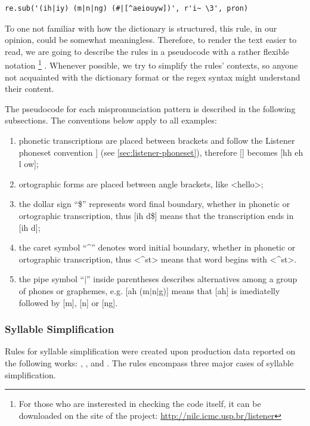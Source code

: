 \begin{lstlisting}[float=!h,caption=Example of a fully-specified regex rule.]
re.sub('(ih|iy) (m|n|ng) (#|[^aeiouyw])', r'i~ \3', pron)
\end{lstlisting}

To one not familiar with how the dictionary is structured, this rule, in our opinion, could be somewhat meaningless. Therefore,  to 
render the text easier to read, we are going to describe the rules in a pseudocode with a rather flexible notation
\footnote{For those who are insterested in checking the code itself, it can be downloaded on the site of the project:
\url{http://nilc.icmc.usp.br/listener}}
.
Whenever possible, we try to simplify the rules' contexts, so anyone not acquainted with the dictionary format or the
\ac{regex} syntax might understand their content.

The pseudocode for each mispronunciation pattern is described in the following subsections. The conventions below apply to all examples:

\begin{enumerate}
 \item phonetic transcriptions are placed between brackets and follow the Listener phoneset convention ]
 (see \autoref{sec:listener-phoneset}), therefore [] becomes [hh eh l ow];
 \item ortographic forms are placed between angle brackets, like <hello>;
 \item the dollar sign ``\$'' represents word final boundary, whether in phonetic or ortographic transcription, 
 thus [ih d\$] means that the transcription ends in [ih d];
 \item the caret symbol ``\textasciicircum'' denotes word initial boundary, whether in phonetic or 
 ortographic transcription, thus <\textasciicircum st> means that word begins with <\textasciicircum st>.
 \item the pipe symbol ``$\vert$'' inside parentheses describes alternatives among a group of phones or 
 graphemes, e.g. [ah (m$\vert$n$\vert$g)] means that [ah] is imediatelly followed by [m], [n] or [ng].
\end{enumerate}

\subsubsection{Syllable Simplification}
Rules for syllable simplification were created upon production data reported on the following works:
\citeauthor{Cardoso2011} \citep{Cardoso2011}, \citeauthor{Silveira2012} \citep{Silveira2012}
\citeauthor{Rauber2004} \citep{Rauber2004}, and \citeauthor{Rebello2006} \citep{Rebello2006}. The rules
encompass three major cases of syllable simplification. 

